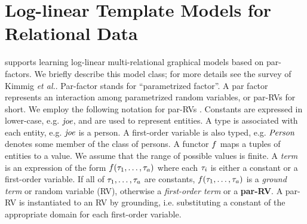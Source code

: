\documentclass{article} %
\begin{document}




\section{Log-linear Template Models for Relational Data} \label{sec:log-linear}
\FB supports learning log-linear multi-relational graphical models based on par-factors. We briefly describe this model class; for more details see the survey of Kimmig {\em et al.}\cite{Kimmig2015}. 
Par-factor stands for ``parametrized factor''. A par factor represents an interaction among parametrized random variables, or par-RVs for short. 
We employ the following notation 
for par-RVs \cite[2.2.5]{Kimmig2015}.
	Constants are expressed in lower-case, e.g. $\it{joe}$, and are used to represent entities. A type is associated with each entity, e.g. $\it{joe}$ is a person. 
A first-order variable is also typed, e.g. $\it{Person}$ denotes some member of the class of persons. A functor $f$ maps a tuples of entities to a value. We assume that the range of possible values is finite.  A {\em term} is an expression of the form $f(\tau_{1},\ldots,\tau_{a})$ where each $\tau_{i}$ is either a constant or a first-order variable. If all of $\tau_{1},\ldots,\tau_{a}$ are constants, $f(\tau_{1},\ldots,\tau_{a})$ is a {\em ground term} or random variable (RV), otherwise a {\em first-order term} or a \textbf{par-RV}. A par-RV is instantiated to an RV by grounding, i.e. substituting a constant of the appropriate domain for each first-order variable. 
\end{document}
